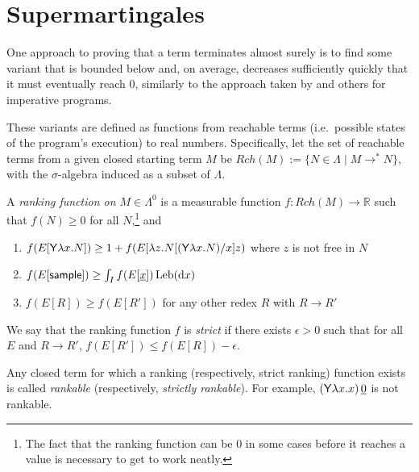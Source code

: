 \section{Supermartingales}
\label{sec:supermartingales}

One approach to proving that a term terminates almost surely is to find some variant that is bounded below and, on average, decreases sufficiently quickly that it must eventually reach 0, similarly to the approach taken by 
\cite{DBLP:conf/popl/FioritiH15} and others for imperative programs.

These variants are defined as functions from reachable terms (i.e.~possible states of the program's execution) to real numbers. Specifically, let the set of reachable terms from a given closed starting term $M$ be $Rch(M) := \{N \in \Lambda \mid M \to^* N \}$, with the $\sigma$-algebra induced as a subset of $\Lambda$.

\begin{definition}\rm
\label{def:ranking function}
A \emph{ranking function on $M \in \Lambda^0$} is a measurable function $f:\mathit{Rch}(M) \to \mathbb{R}$ such that $f(N) \geq 0$ for all $N$,\footnote{The fact that the ranking function can be 0 in some cases before it reaches a value is necessary to get  to work neatly.} and
\begin{enumerate}
    \item $f(E[\mathsf{Y} \lambda x. N]) \geq 1+ f(E[\lambda z. N[(\mathsf{Y} \lambda x. N)/x] z)$ where $z$ is not free in $N$
    \item $f(E[\mathsf{sample}]) \geq \int_I f(E[\underline{x}]) \, \mathrm{Leb}(\mathrm{d}x)$
    \item $f(E[R]) \geq f(E[R'])$ for any other redex $R$ with $R \to R'$
\end{enumerate}
\iffalse
\lo{@Andrew: As defined, ranking function $f$ is not required to satisfy: $f(N) = 0$ iff $N$ is a value. But for AST analysis, we always require $f$ to satisfy this property. It seems cleaner to include this in the definition.} 
\akr{The fact that the ranking function can be 0 in some cases before it reaches a value is necessary to get \Cref{thm:minimal} to work neatly.}
\lo{OK. Let's leave \Cref{def:ranking function} as it is.}
\fi
We say that the ranking function $f$ is \emph{strict} if there exists $\epsilon > 0$ such that for all $E$ and $R \to R'$, $f(E[R']) \leq f(E[R]) - \epsilon$.

Any closed term for which a ranking (respectively, strict ranking) function exists is called \emph{rankable} (respectively, \emph{strictly rankable}). 
For example, $(\mathsf{Y} \lambda x.x) \, \underline 0$ is not rankable.
\end{definition}

